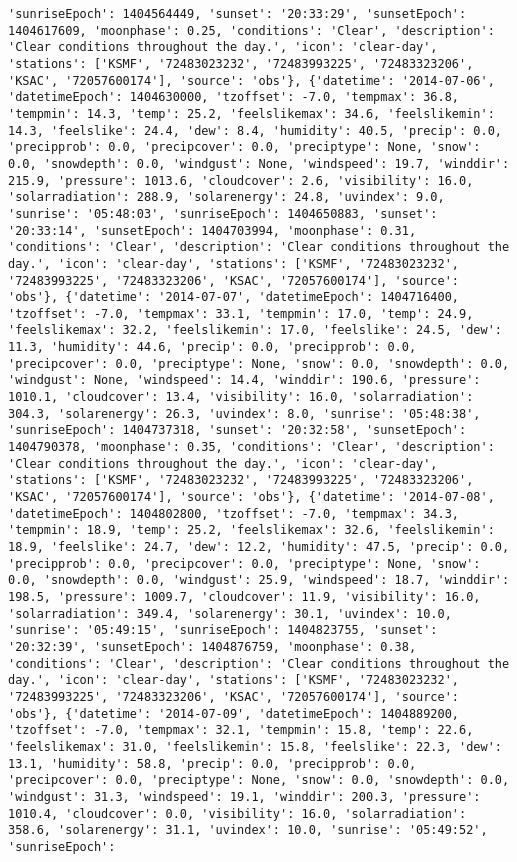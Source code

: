 \documentclass[
  letterpaper,
  DIV=11,
  numbers=noendperiod]{scrartcl}
\begin{document}
\begin{verbatim}
'sunriseEpoch': 1404564449, 'sunset': '20:33:29', 'sunsetEpoch': 1404617609, 'moonphase': 0.25, 'conditions': 'Clear', 'description': 'Clear conditions throughout the day.', 'icon': 'clear-day', 'stations': ['KSMF', '72483023232', '72483993225', '72483323206', 'KSAC', '72057600174'], 'source': 'obs'}, {'datetime': '2014-07-06', 'datetimeEpoch': 1404630000, 'tzoffset': -7.0, 'tempmax': 36.8, 'tempmin': 14.3, 'temp': 25.2, 'feelslikemax': 34.6, 'feelslikemin': 14.3, 'feelslike': 24.4, 'dew': 8.4, 'humidity': 40.5, 'precip': 0.0, 'precipprob': 0.0, 'precipcover': 0.0, 'preciptype': None, 'snow': 0.0, 'snowdepth': 0.0, 'windgust': None, 'windspeed': 19.7, 'winddir': 215.9, 'pressure': 1013.6, 'cloudcover': 2.6, 'visibility': 16.0, 'solarradiation': 288.9, 'solarenergy': 24.8, 'uvindex': 9.0, 'sunrise': '05:48:03', 'sunriseEpoch': 1404650883, 'sunset': '20:33:14', 'sunsetEpoch': 1404703994, 'moonphase': 0.31, 'conditions': 'Clear', 'description': 'Clear conditions throughout the day.', 'icon': 'clear-day', 'stations': ['KSMF', '72483023232', '72483993225', '72483323206', 'KSAC', '72057600174'], 'source': 'obs'}, {'datetime': '2014-07-07', 'datetimeEpoch': 1404716400, 'tzoffset': -7.0, 'tempmax': 33.1, 'tempmin': 17.0, 'temp': 24.9, 'feelslikemax': 32.2, 'feelslikemin': 17.0, 'feelslike': 24.5, 'dew': 11.3, 'humidity': 44.6, 'precip': 0.0, 'precipprob': 0.0, 'precipcover': 0.0, 'preciptype': None, 'snow': 0.0, 'snowdepth': 0.0, 'windgust': None, 'windspeed': 14.4, 'winddir': 190.6, 'pressure': 1010.1, 'cloudcover': 13.4, 'visibility': 16.0, 'solarradiation': 304.3, 'solarenergy': 26.3, 'uvindex': 8.0, 'sunrise': '05:48:38', 'sunriseEpoch': 1404737318, 'sunset': '20:32:58', 'sunsetEpoch': 1404790378, 'moonphase': 0.35, 'conditions': 'Clear', 'description': 'Clear conditions throughout the day.', 'icon': 'clear-day', 'stations': ['KSMF', '72483023232', '72483993225', '72483323206', 'KSAC', '72057600174'], 'source': 'obs'}, {'datetime': '2014-07-08', 'datetimeEpoch': 1404802800, 'tzoffset': -7.0, 'tempmax': 34.3, 'tempmin': 18.9, 'temp': 25.2, 'feelslikemax': 32.6, 'feelslikemin': 18.9, 'feelslike': 24.7, 'dew': 12.2, 'humidity': 47.5, 'precip': 0.0, 'precipprob': 0.0, 'precipcover': 0.0, 'preciptype': None, 'snow': 0.0, 'snowdepth': 0.0, 'windgust': 25.9, 'windspeed': 18.7, 'winddir': 198.5, 'pressure': 1009.7, 'cloudcover': 11.9, 'visibility': 16.0, 'solarradiation': 349.4, 'solarenergy': 30.1, 'uvindex': 10.0, 'sunrise': '05:49:15', 'sunriseEpoch': 1404823755, 'sunset': '20:32:39', 'sunsetEpoch': 1404876759, 'moonphase': 0.38, 'conditions': 'Clear', 'description': 'Clear conditions throughout the day.', 'icon': 'clear-day', 'stations': ['KSMF', '72483023232', '72483993225', '72483323206', 'KSAC', '72057600174'], 'source': 'obs'}, {'datetime': '2014-07-09', 'datetimeEpoch': 1404889200, 'tzoffset': -7.0, 'tempmax': 32.1, 'tempmin': 15.8, 'temp': 22.6, 'feelslikemax': 31.0, 'feelslikemin': 15.8, 'feelslike': 22.3, 'dew': 13.1, 'humidity': 58.8, 'precip': 0.0, 'precipprob': 0.0, 'precipcover': 0.0, 'preciptype': None, 'snow': 0.0, 'snowdepth': 0.0, 'windgust': 31.3, 'windspeed': 19.1, 'winddir': 200.3, 'pressure': 1010.4, 'cloudcover': 0.0, 'visibility': 16.0, 'solarradiation': 358.6, 'solarenergy': 31.1, 'uvindex': 10.0, 'sunrise': '05:49:52', 'sunriseEpoch': 
\end{verbatim}
\end{document}
